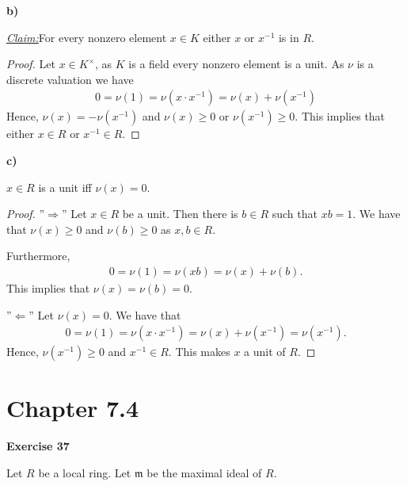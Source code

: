 \documentclass{article}
\newcommand{\m}{\mathfrak{m}}
\newcommand{\inv}[1]{{#1}^{-1}}
\newcommand{\claim}
{\underline{\textit{Claim:}}\hspace{0,2cm}}
\newcommand{\aufgabe}[1]{
{
	\vspace*{0.5cm}
	\noindent\textsf{\textbf{Exercise #1}}
	\vspace*{0.2cm}

}
}
\newcommand{\teilaufgabe}[1]{
{       

	\noindent\hspace*{0,1 cm}\textbf{#1)}
}
}
\theoremstyle{definition}
\theoremstyle{plain}
\theoremstyle{remark}
\begin{document}
\teilaufgabe{b} \claim For every nonzero element $x\in K$ either $x$ or $x^{-1}$ is in $R$.
\begin{proof}
	Let $x\in K^{\times}$, as $K$ is a field every nonzero element is a unit. As $\nu$ is a discrete valuation we have
	\begin{align}
		0 = \nu(1) = \nu (x \cdot x^{-1}) = \nu(x) + \nu(x^{-1})
	\end{align}
	Hence, $\nu(x) = - \nu(x^{-1})$ and $\nu(x)\geq 0$ or $\nu(\inv{x})\geq0$. This implies that either $x\in R$ or $\inv{x}\in R$.
\end{proof}
\teilaufgabe{c} $x\in R$ is a unit iff $\nu(x) =0$.
\begin{proof}
	''$\Longrightarrow$'' Let $x\in R$ be a unit. Then there is $b\in R$ such that $xb = 1$. We have that $\nu(x)\geq 0$ and $\nu(b)\geq 0$ as $x,b\in R$.

	Furthermore,
	\begin{align}
		0 = \nu(1) = \nu(xb) = \nu(x) +\nu(b).
	\end{align}
	This implies that $\nu(x)=\nu(b)=0$.


	''$\Longleftarrow$'' Let $\nu(x) = 0$. We have that 
	\begin{align}
		0=\nu(1)=\nu(x\cdot\inv{x})=\nu(x)+\nu(\inv{x}) =\nu(\inv{x}).
	\end{align}
	Hence, $\nu(\inv{x})\geq 0$ and $\inv{x}\in R$. This makes $x$ a unit of $R$.
\end{proof}
\section*{Chapter 7.4}
\aufgabe{37} 
Let $R$ be a local ring. Let $\m$ be the maximal ideal of $R$.
\end{document}
